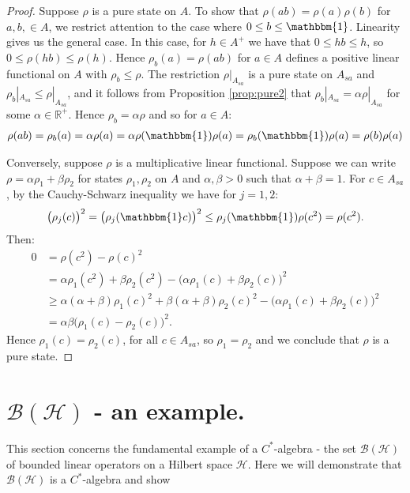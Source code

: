 \documentclass[12pt,a4paper]{report}
\theoremstyle{plain}
\theoremstyle{definition}
\newcommand{\1}{\mathbbm{1}}
\newcommand{\R}{\mathbb{R}}
\renewcommand{\H}{\mathcal{H}}
\newcommand{\B}{\mathcal{B}}
\begin{document}
\begin{proof}
	Suppose $\rho$ is a pure state on $A$. To show that $\rho(ab)=\rho(a)\rho(b)$ for $a,b,\in A$,
	we restrict attention to the case where $0\leq b\leq\1$. Linearity gives us the general case.
	In this case, for $h\in A^+$ we have that $0\leq hb\leq h$, so $0\leq\rho(hb)\leq\rho(h)$.
	Hence $\rho_b(a)=\rho(ab)$ for $a\in A$ defines a positive linear functional on $A$ with 
	$\rho_b\leq\rho$. The restriction $\rho|_{A_{sa}}$ is a pure state on $A_{sa}$ and 
	$\rho_b|_{A_{sa}} \leq \rho|_{A_{sa}}$, and it follows from Proposition \ref{prop:pure2} that 
	$\rho_b|_{A_{sa}} = \alpha \rho|_{A_{sa}}$ for some $\alpha \in \R^+$.
	Hence $\rho_b = \alpha\rho$  and so for $a\in A$:
	\begin{align*}
		\rho(ab) = \rho_b(a) = \alpha\rho(a) = 
							\alpha\rho(\1)\rho(a) = \rho_b(\1)\rho(a) = \rho(b)\rho(a)
	\end{align*}
	
	Conversely, suppose $\rho$ is a multiplicative linear functional.  %
	Suppose we can write $\rho=\alpha\rho_1+\beta\rho_2$ for states $\rho_1,\rho_2$ on $A$ and 
	$\alpha,\beta >0$ such that $\alpha+\beta=1$. For $c\in A_{sa}$, by the Cauchy-Schwarz inequality
	 we have for $j=1,2$:
	\begin{align*}
		\big(\rho_j(c)\big)^2 = \big(\rho_j(\1 c)\big)^2 \leq \rho_j(\1)\rho(c^2)=\rho(c^2).
	\end{align*}
	Then:
	\begin{align*}
				0
		&=		\rho(c^2)-\rho(c)^2 											\\
		&=		\alpha\rho_1(c^2)+\beta\rho_2(c^2) 
						- \big(\alpha\rho_1(c)+\beta\rho_2(c)\big)^2			\\
		&\geq	\alpha(\alpha+\beta)\rho_1(c)^2 
						+ \beta(\alpha+\beta)\rho_2(c)^2
						- \big(\alpha\rho_1(c)+\beta\rho_2(c)\big)^2			\\
		&=		\alpha\beta\big(\rho_1(c) - \rho_2(c)\big)^2.
	\end{align*}
	Hence $\rho_1(c)=\rho_2(c)$, for all $c\in A_{sa}$, so $\rho_1=\rho_2$ and we conclude
	that $\rho$ is a pure state. 
\end{proof}






\section{$\B(\H)$ - an example.}
This section concerns the fundamental example of a $C^\ast$-algebra - the set $\B(\H)$ of bounded 
linear operators on a Hilbert space $\H$.  Here we will demonstrate that $\B(\H)$ is a $C^\ast$-algebra 
and show 
\end{document}
